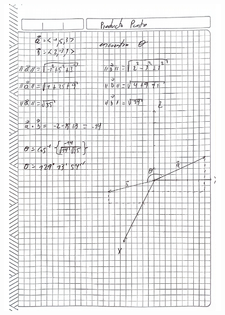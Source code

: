 \documentclass{article}
\begin{document}
\begin{figure}[h!]
    \centering
    \begin{minipage}{0.45\textwidth}
        \centering
        \includegraphics[width=\textwidth]{imgs/Actividad 3 julio amaya.pdf}
    \end{minipage}
    \hfill
    \begin{minipage}{0.45\textwidth}
        \centering

\end{minipage}
\end{figure}
\end{document}
